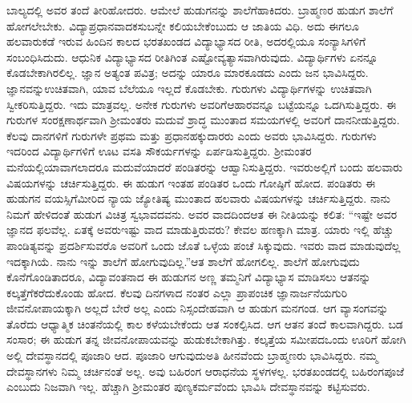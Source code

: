 ಬಾಲ್ಯದಲ್ಲಿ ಅವರ ತಂದೆ ತೀರಿಹೋದರು. ಆಮೇಲೆ ಹುಡುಗನನ್ನು ಶಾಲೆಗೆ\break ಹಾಕಿದರು. ಬ್ರಾಹ್ಮಣರ ಹುಡುಗ ಶಾಲೆಗೆ ಹೋಗಲೇಬೇಕು. ವಿದ್ಯಾಪ್ರಧಾನವಾದ\break ಕಸುಬನ್ನೇ ಕಲಿಯಬೇಕೆಂಬುದು ಆ ಜಾತಿಯ ವಿಧಿ. ಅದು ಈಗಲೂ ಹಲವಾರು\break ಕಡೆ ಇರುವ ಹಿಂದಿನ ಕಾಲದ ಭರತಖಂಡದ ವಿದ್ಯಾಭ್ಯಾಸದ ರೀತಿ, ಅದರಲ್ಲಿಯೂ ಸಂನ್ಯಾಸಿಗಳಿಗೆ ಸಂಬಂಧಿಸಿದುದು. ಆಧುನಿಕ ವಿದ್ಯಾಭ್ಯಾಸದ ರೀತಿಗಿಂತ ಎಷ್ಟೋ\break ವ್ಯತ್ಯಾಸವಾಗಿರುವುದು. ವಿದ್ಯಾರ್ಥಿಗಳು ಏನನ್ನೂ ಕೊಡಬೇಕಾಗಿರಲಿಲ್ಲ. ಜ್ಞಾನ ಅತ್ಯಂತ ಪವಿತ್ರ; ಅದನ್ನು ಯಾರೂ ಮಾರಕೂಡದು ಎಂದು ಜನ ಭಾವಿಸಿದ್ದರು. ಜ್ಞಾನವನ್ನು\break ಉಚಿತವಾಗಿ, ಯಾವ ಬೆಲೆಯೂ ಇಲ್ಲದೆ ಕೊಡಬೇಕು. ಗುರುಗಳು ವಿದ್ಯಾರ್ಥಿಗಳನ್ನು ಉಚಿತವಾಗಿ ಸ್ವೀಕರಿಸುತ್ತಿದ್ದರು. ಇದು ಮಾತ್ರವಲ್ಲ. ಅನೇಕ ಗುರುಗಳು ಅವರಿಗೆ\break ಆಹಾರವನ್ನೂ ಬಟ್ಟೆಯನ್ನೂ ಒದಗಿಸುತ್ತಿದ್ದರು. ಈ ಗುರುಗಳ ಸಂರಕ್ಷಣಾರ್ಥವಾಗಿ ಶ‍್ರೀಮಂತರು ಮದುವೆ ಶ್ರಾದ್ಧ ಮುಂತಾದ ಸಮಯಗಳಲ್ಲಿ ಅವರಿಗೆ ದಾನ\break ನೀಡುತ್ತಿದ್ದರು. ಕೆಲವು ದಾನಗಳಿಗೆ ಗುರುಗಳೇ ಪ್ರಥಮ ಮತ್ತು ಪ್ರಧಾನ\break ಹಕ್ಕುದಾರರು ಎಂದು ಅವರು ಭಾವಿಸಿದ್ದರು. ಗುರುಗಳು ಇದರಿಂದ ವಿದ್ಯಾರ್ಥಿ\break ಗಳಿಗೆ ಊಟ ವಸತಿ ಸೌಕರ್ಯಗಳನ್ನು ಏರ್ಪಡಿಸುತ್ತಿದ್ದರು. ಶ‍್ರೀಮಂತರ ಮನೆಯಲ್ಲಿ\break ಯಾವಾಗಲಾದರೂ ಮದುವೆಯಾದರೆ ಪಂಡಿತರನ್ನು ಆಹ್ವಾನಿಸುತ್ತಿದ್ದರು. ಇವರು\break ಅಲ್ಲಿಗೆ ಬಂದು ಹಲವಾರು ವಿಷಯಗಳನ್ನು ಚರ್ಚಿಸುತ್ತಿದ್ದರು. ಈ ಹುಡುಗ ಇಂತಹ ಪಂಡಿತರ ಒಂದು ಗೋಷ್ಠಿಗೆ ಹೋದ. ಪಂಡಿತರು ಈ ಹುಡುಗನ ವಯಸ್ಸಿಗೆ\break ಮೀರಿದ ನ್ಯಾಯ ಜ್ಯೋತಿಷ್ಯ ಮುಂತಾದ ಹಲವಾರು ವಿಷಯಗಳನ್ನು ಚರ್ಚಿಸುತ್ತಿದ್ದರು. ನಾನು ನಿಮಗೆ ಹೇಳಿದಂತೆ ಹುಡುಗ ವಿಚಿತ್ರ ಸ್ವಭಾವದವನು. ಅವರ ವಾದದಿಂದ\break ಆತ ಈ ನೀತಿಯನ್ನು ಕಲಿತ: “ಇಷ್ಟೇ ಅವರ ಜ್ಞಾನದ ಫಲವೆಲ್ಲ. ಏತಕ್ಕೆ ಅವರು\break ಇಷ್ಟು ವಾದ ಮಾಡುತ್ತಿರುವರು? ಕೇವಲ ಹಣಕ್ಕಾಗಿ ಮಾತ್ರ. ಯಾರು ಇಲ್ಲಿ ಹೆಚ್ಚು ಪಾಂಡಿತ್ಯವನ್ನು ಪ್ರದರ್ಶಿಸುವರೊ ಅವರಿಗೆ ಒಂದು ಜೊತೆ ಒಳ್ಳೆಯ ಪಂಚೆ ಸಿಕ್ಕುವುದು. ಇವರು ವಾದ ಮಾಡುವುದೆಲ್ಲ ಇದಕ್ಕಾಗಿಯೆ. ನಾನು ಇನ್ನು ಶಾಲೆಗೆ ಹೋಗುವುದಿಲ್ಲ.”\break ಆತ ಶಾಲೆಗೆ ಹೋಗಲಿಲ್ಲ. ಶಾಲೆಗೆ ಹೋಗುವುದು ಕೊನೆಗೊಂಡಿತಾದರೂ, ವಿದ್ಯಾವಂತನಾದ ಈ ಹುಡುಗನ ಅಣ್ಣ ತಮ್ಮನಿಗೆ ವಿದ್ಯಾಭ್ಯಾಸ ಮಾಡಿಸಲು ಆತನನ್ನು ಕಲ್ಕತ್ತೆಗೆ\break ಕರೆದುಕೊಂಡು ಹೋದ. ಕೆಲವು ದಿನಗಳಾದ ನಂತರ ಎಲ್ಲಾ ಪ್ರಾಪಂಚಿಕ ಜ್ಞಾನಾರ್ಜನೆಯ\break ಗುರಿ ಜೀವನೋಪಾಯಕ್ಕಾಗಿ ಅಲ್ಲದೆ ಬೇರೆ ಅಲ್ಲ ಎಂದು ನಿಸ್ಸಂದೇಹವಾಗಿ ಆ ಹುಡುಗ ಮನಗಂಡ. ಆಗ ವ್ಯಾಸಂಗವನ್ನು ತೊರೆದು ಆಧ್ಯಾತ್ಮಿಕ ಚಿಂತನೆಯಲ್ಲಿ ಕಾಲ ಕಳೆಯಬೇಕೆಂದು ಆತ ಸಂಕಲ್ಪಿಸಿದ. ಆಗ ಆತನ ತಂದೆ ಕಾಲವಾಗಿದ್ದರು. ಬಡ ಸಂಸಾರ; ಈ ಹುಡುಗ ತನ್ನ ಜೀವನೋಪಾಯವನ್ನು ಹುಡುಕಬೇಕಾಗಿತ್ತು. ಕಲ್ಕತ್ತೆಯ ಸಮೀಪದ\break ಒಂದು ಊರಿಗೆ ಹೋಗಿ ಅಲ್ಲಿ ದೇವಸ್ಥಾನದಲ್ಲಿ ಪೂಜಾರಿ ಆದ. ಪೂಜಾರಿ ಆಗುವುದು\break ಅತಿ ಹೀನವೆಂದು ಬ್ರಾಹ್ಮಣರು ಭಾವಿಸಿದ್ದರು. ನಮ್ಮ ದೇವಸ್ಥಾನಗಳು ನಿಮ್ಮ ಚರ್ಚಿನಂತೆ ಅಲ್ಲ. ಅವು ಬಹಿರಂಗ ಆರಾಧನೆಯ ಸ್ಥಳಗಳಲ್ಲ. ಭರತಖಂಡದಲ್ಲಿ ಬಹಿರಂಗಪೂಜೆ ಎಂಬುದು ನಿಜವಾಗಿ ಇಲ್ಲ. ಹೆಚ್ಚಾಗಿ ಶ‍್ರೀಮಂತರ ಪುಣ್ಯಕರ್ಮವೆಂದು ಭಾವಿಸಿ ದೇವಸ್ಥಾನವನ್ನು ಕಟ್ಟಿಸುವರು.

